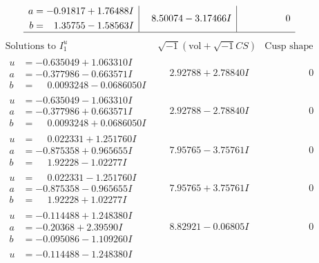 \documentclass[1p]{elsarticle_modified}
\theoremstyle{definition}
\newcommand{\I}{\sqrt{-1}}
\begin{document}
$$\begin{array}{c|c|c}
\begin{aligned}
a &= -0.91817 + 1.76488 I \\
b &= \phantom{-}1.35755 - 1.58563 I\end{aligned}
 & \phantom{-}8.50074 - 3.17466 I & \phantom{-0.000000 } 0\\
 \hline 
 \end{array}$$\newpage$$\begin{array}{c|c|c}  
\text{Solutions to }I^u_{1}& \I (\text{vol} + \sqrt{-1}CS) & \text{Cusp shape}\\
 \hline 
\begin{aligned}
u &= -0.635049 + 1.063310 I \\
a &= -0.377986 - 0.663571 I \\
b &= \phantom{-}0.0093248 - 0.0686050 I\end{aligned}
 & \phantom{-}2.92788 + 2.78840 I & \phantom{-0.000000 } 0 \\ \hline\begin{aligned}
u &= -0.635049 - 1.063310 I \\
a &= -0.377986 + 0.663571 I \\
b &= \phantom{-}0.0093248 + 0.0686050 I\end{aligned}
 & \phantom{-}2.92788 - 2.78840 I & \phantom{-0.000000 } 0 \\ \hline\begin{aligned}
u &= \phantom{-}0.022331 + 1.251760 I \\
a &= -0.875358 + 0.965655 I \\
b &= \phantom{-}1.92228 - 1.02277 I\end{aligned}
 & \phantom{-}7.95765 - 3.75761 I & \phantom{-0.000000 } 0 \\ \hline\begin{aligned}
u &= \phantom{-}0.022331 - 1.251760 I \\
a &= -0.875358 - 0.965655 I \\
b &= \phantom{-}1.92228 + 1.02277 I\end{aligned}
 & \phantom{-}7.95765 + 3.75761 I & \phantom{-0.000000 } 0 \\ \hline\begin{aligned}
u &= -0.114488 + 1.248380 I \\
a &= -0.20368 + 2.39590 I \\
b &= -0.095086 - 1.109260 I\end{aligned}
 & \phantom{-}8.82921 - 0.06805 I & \phantom{-0.000000 } 0 \\ \hline\begin{aligned}
u &= -0.114488 - 1.248380 I \\

\end{aligned}
\end{array}$$
\end{document}
